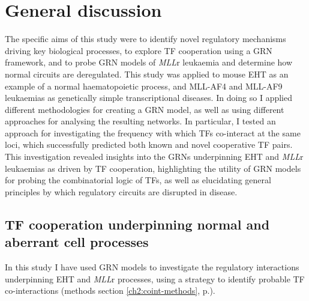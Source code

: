 \chapter{\label{chapter6_discussion}General discussion}

\begingroup
\raggedright
\minitoc
\endgroup

\clearpage

The specific aims of this study were to identify novel regulatory mechanisms driving key biological processes, to explore TF cooperation using a GRN framework, and to probe GRN models of \textit{MLL}r leukaemia and determine how normal circuits are deregulated. This study was applied to mouse EHT as an example of a normal haematopoietic process, and MLL-AF4 and MLL-AF9 leukaemias as genetically simple transcriptional diseases. In doing so I applied different methodologies for creating a GRN model, as well as using different approaches for analysing the resulting networks. In particular, I tested an approach for investigating the frequency with which TFs co-interact at the same loci, which successfully predicted both known and novel cooperative TF pairs. This investigation revealed insights into the GRNs underpinning EHT and \textit{MLL}r leukaemias as driven by TF cooperation, highlighting the utility of GRN models for probing the combinatorial logic of TFs, as well as elucidating general principles by which regulatory circuits are disrupted in disease.

\section{\label{ch6:coop}TF cooperation underpinning normal and aberrant cell processes}

In this study I have used GRN models to investigate the regulatory interactions underpinning EHT and \textit{MLL}r processes, using a strategy to identify probable TF co-interactions (methods section \ref{ch2:coint-methods}, p.\pageref{ch2:coint-methods}). 


